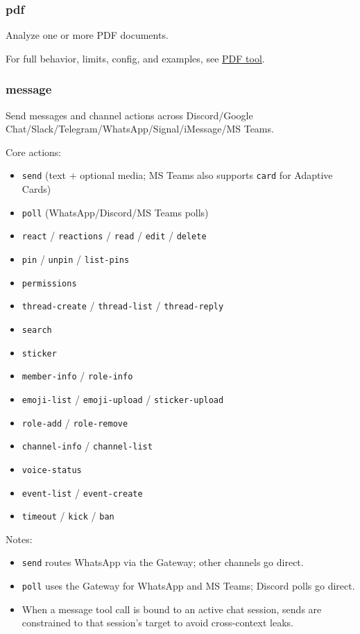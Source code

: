 \subsubsection{pdf}


Analyze one or more PDF documents.

For full behavior, limits, config, and examples, see \href{/tools/pdf}{PDF tool}.

\subsubsection{message}


Send messages and channel actions across Discord/Google Chat/Slack/Telegram/WhatsApp/Signal/iMessage/MS Teams.

Core actions:

\begin{itemize}
  \item \texttt{send} (text + optional media; MS Teams also supports \texttt{card} for Adaptive Cards)
  \item \texttt{poll} (WhatsApp/Discord/MS Teams polls)
  \item \texttt{react} / \texttt{reactions} / \texttt{read} / \texttt{edit} / \texttt{delete}
  \item \texttt{pin} / \texttt{unpin} / \texttt{list-pins}
  \item \texttt{permissions}
  \item \texttt{thread-create} / \texttt{thread-list} / \texttt{thread-reply}
  \item \texttt{search}
  \item \texttt{sticker}
  \item \texttt{member-info} / \texttt{role-info}
  \item \texttt{emoji-list} / \texttt{emoji-upload} / \texttt{sticker-upload}
  \item \texttt{role-add} / \texttt{role-remove}
  \item \texttt{channel-info} / \texttt{channel-list}
  \item \texttt{voice-status}
  \item \texttt{event-list} / \texttt{event-create}
  \item \texttt{timeout} / \texttt{kick} / \texttt{ban}
\end{itemize}


Notes:

\begin{itemize}
  \item \texttt{send} routes WhatsApp via the Gateway; other channels go direct.
  \item \texttt{poll} uses the Gateway for WhatsApp and MS Teams; Discord polls go direct.
  \item When a message tool call is bound to an active chat session, sends are constrained to that session’s target to avoid cross-context leaks.
\end{itemize}


